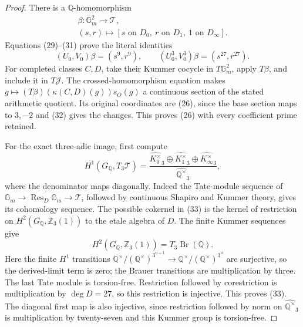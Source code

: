 \begin{proof}
There is a \(\mathbb Q\)-homomorphism
\[
\begin{gathered}
 \beta:\mathbb G_m^2\longrightarrow\mathcal T,\\
 (s,r)\longmapsto
     [s\text{ on }D_0,\ r\text{ on }D_1,
                             \ 1\text{ on }D_\infty].
\end{gathered}
                                                        \tag{31}
\]
Equations (29)--(31) prove the literal identities
\[
 (U_0,V_0)\beta=(s^9,r^9),\qquad
 (U_0^3,V_0^3)\beta=(s^{27},r^{27}).                 \tag{32}
\]
For completed classes \(C,D\), take their Kummer
cocycle in \(T\mathbb G_m^2\), apply
\(T\beta\), and include it in \(T\mathcal J\).
The crossed-homomorphism equation makes
\(g\mapsto (T\beta)(\kappa(C,D)(g))s_O(g)\)
a continuous section of the stated arithmetic
quotient. Its original coordinates are (26), since
the base section maps to \(3,-2\) and (32) gives
the changes. This proves (26) with every coefficient
prime retained.

For the exact three-adic image, first compute
\[
 H^1(G_{\mathbb Q},T_3\mathcal T)
   =\frac{\widehat{K_0^\times}_3\oplus
          \widehat{K_1^\times}_3\oplus
          \widehat{K_\infty^\times}_3}
          {\widehat{\mathbb Q^\times}_3},             \tag{33}
\]
where the denominator maps diagonally. Indeed the
Tate-module sequence of
\(\mathbb G_m\to\operatorname{Res}_D\mathbb G_m
\to\mathcal T\), followed by continuous Shapiro
and Kummer theory, gives its cohomology sequence.
The possible cokernel in (33) is the kernel of
restriction on \(H^2(G_{\mathbb Q},\mathbb Z_3(1))\)
to the etale algebra of \(D\). The finite Kummer
sequences give
\[
 H^2(G_{\mathbb Q},\mathbb Z_3(1))
               =T_3\operatorname{Br}(\mathbb Q).
\]
Here the finite \(H^1\) transitions
\(\mathbb Q^\times/(\mathbb Q^\times)^{3^{n+1}}
\to\mathbb Q^\times/(\mathbb Q^\times)^{3^n}\)
are surjective, so the derived-limit term is zero;
the Brauer transitions are multiplication by three.
The last Tate module is torsion-free. Restriction
followed by corestriction is multiplication by
\(\deg D=27\), so this restriction is injective.
This proves (33). The diagonal first map is also
injective, since restriction followed by norm on
\(\widehat{\mathbb Q^\times}_3\) is multiplication
by twenty-seven and this Kummer group is torsion-free.


\end{proof}
